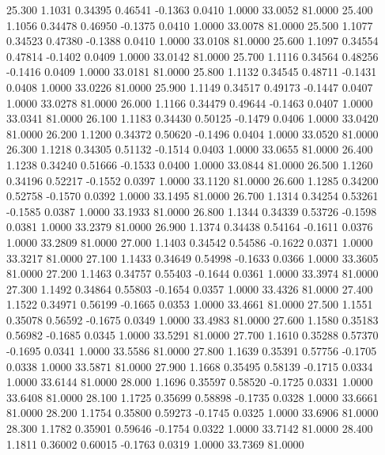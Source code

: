   25.300   1.1031   0.34395   0.46541  -0.1363   0.0410   1.0000  33.0052  81.0000
  25.400   1.1056   0.34478   0.46950  -0.1375   0.0410   1.0000  33.0078  81.0000
  25.500   1.1077   0.34523   0.47380  -0.1388   0.0410   1.0000  33.0108  81.0000
  25.600   1.1097   0.34554   0.47814  -0.1402   0.0409   1.0000  33.0142  81.0000
  25.700   1.1116   0.34564   0.48256  -0.1416   0.0409   1.0000  33.0181  81.0000
  25.800   1.1132   0.34545   0.48711  -0.1431   0.0408   1.0000  33.0226  81.0000
  25.900   1.1149   0.34517   0.49173  -0.1447   0.0407   1.0000  33.0278  81.0000
  26.000   1.1166   0.34479   0.49644  -0.1463   0.0407   1.0000  33.0341  81.0000
  26.100   1.1183   0.34430   0.50125  -0.1479   0.0406   1.0000  33.0420  81.0000
  26.200   1.1200   0.34372   0.50620  -0.1496   0.0404   1.0000  33.0520  81.0000
  26.300   1.1218   0.34305   0.51132  -0.1514   0.0403   1.0000  33.0655  81.0000
  26.400   1.1238   0.34240   0.51666  -0.1533   0.0400   1.0000  33.0844  81.0000
  26.500   1.1260   0.34196   0.52217  -0.1552   0.0397   1.0000  33.1120  81.0000
  26.600   1.1285   0.34200   0.52758  -0.1570   0.0392   1.0000  33.1495  81.0000
  26.700   1.1314   0.34254   0.53261  -0.1585   0.0387   1.0000  33.1933  81.0000
  26.800   1.1344   0.34339   0.53726  -0.1598   0.0381   1.0000  33.2379  81.0000
  26.900   1.1374   0.34438   0.54164  -0.1611   0.0376   1.0000  33.2809  81.0000
  27.000   1.1403   0.34542   0.54586  -0.1622   0.0371   1.0000  33.3217  81.0000
  27.100   1.1433   0.34649   0.54998  -0.1633   0.0366   1.0000  33.3605  81.0000
  27.200   1.1463   0.34757   0.55403  -0.1644   0.0361   1.0000  33.3974  81.0000
  27.300   1.1492   0.34864   0.55803  -0.1654   0.0357   1.0000  33.4326  81.0000
  27.400   1.1522   0.34971   0.56199  -0.1665   0.0353   1.0000  33.4661  81.0000
  27.500   1.1551   0.35078   0.56592  -0.1675   0.0349   1.0000  33.4983  81.0000
  27.600   1.1580   0.35183   0.56982  -0.1685   0.0345   1.0000  33.5291  81.0000
  27.700   1.1610   0.35288   0.57370  -0.1695   0.0341   1.0000  33.5586  81.0000
  27.800   1.1639   0.35391   0.57756  -0.1705   0.0338   1.0000  33.5871  81.0000
  27.900   1.1668   0.35495   0.58139  -0.1715   0.0334   1.0000  33.6144  81.0000
  28.000   1.1696   0.35597   0.58520  -0.1725   0.0331   1.0000  33.6408  81.0000
  28.100   1.1725   0.35699   0.58898  -0.1735   0.0328   1.0000  33.6661  81.0000
  28.200   1.1754   0.35800   0.59273  -0.1745   0.0325   1.0000  33.6906  81.0000
  28.300   1.1782   0.35901   0.59646  -0.1754   0.0322   1.0000  33.7142  81.0000
  28.400   1.1811   0.36002   0.60015  -0.1763   0.0319   1.0000  33.7369  81.0000
